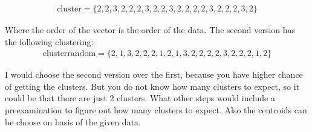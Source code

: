 \begin{align*}
\text{cluster} = \{2,2,3,2,2,2,3,2,2,3,2,2,2,2,3,2,2,2,3,2\} 
\end{align*}

Where the order of the vector is the order of the data. The second version has
the following clustering:
\begin{align*}
\text{clusterrandom} =\{ 2,1,3,2,2,2,1,2,1,3,2,2,2,2,3,2,2,2,1,2\}
\end{align*}

I would choose the second version over the first, because you have higher chance
of getting the clusters. But you do not know how many clusters to expect, so it
could be that there are just 2 clusters. What other steps would include a
preexamination to figure out how many clusters to expect. Also the centroids can
be choose on basis of the given data.


